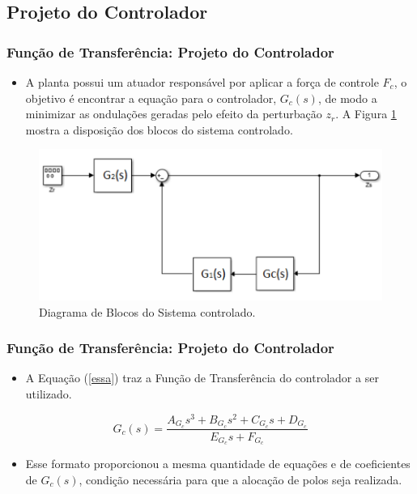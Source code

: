 \documentclass{beamer}
\begin{document}
\subsection{Projeto do Controlador}
\begin{frame}
\frametitle{Função de Transferência: Projeto do Controlador}
\begin{itemize}
\item A planta possui um atuador responsável por aplicar a força de controle $F_c$, o objetivo é encontrar a equação para o controlador, $G_c(s)$, de modo a minimizar as ondulações geradas pelo efeito da perturbação $z_r$. A Figura \ref{blocos} mostra a disposição dos blocos do sistema controlado.
\end{itemize}

\begin{figure}[H]
  \centering
  \includegraphics[width=.65\columnwidth]{./imagens/diagrama_malha_fechada.pdf}
    \renewcommand{\figurename}{Fig. 3}
    \caption{Diagrama de Blocos do Sistema controlado.}
  \label{blocos}
\end{figure}
\end{frame}

\begin{frame}
\frametitle{Função de Transferência: Projeto do Controlador}
\begin{itemize}
\item A Equação (\ref{essa}) traz a Função de Transferência do controlador a ser utilizado.
\end{itemize}

\begin{equation}\label{essa}
G_c(s)=\frac{A_{G_c}s^3+B_{G_c}s^2+C_{G_c}s+D_{G_c}}{E_{G_c}s+F_{G_c}}
\end{equation}

\begin{itemize}
\item Esse formato proporcionou a mesma quantidade de equações e de coeficientes de $G_c(s)$, condição necessária para que a alocação de polos seja realizada.
\end{itemize}
\end{frame}
\end{document}
